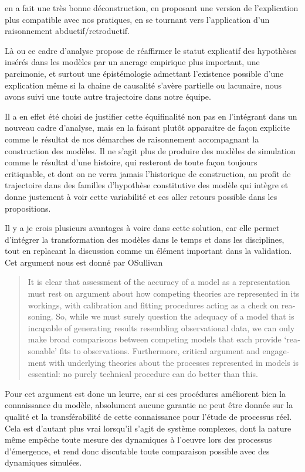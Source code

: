  \autocite{Besse2000} en a fait une très bonne déconstruction, en proposant une version de l'explication plus compatible avec nos pratiques, en se tournant  vers l'application d'un raisonnement abductif/retroductif.

Là ou ce cadre d'analyse propose de réaffirmer le statut explicatif des hypothèses insérés dans les modèles par un ancrage empirique plus important, une parcimonie, et surtout une épistémologie admettant l'existence possible d'une explication même si la chaine de causalité s'avère partielle ou lacunaire, nous avons suivi une toute autre trajectoire dans notre équipe.

Il a en effet été choisi de justifier cette équifinalité non pas en l'intégrant dans un nouveau cadre d'analyse, mais en la faisant plutôt apparaitre de façon explicite comme le résultat de nos démarches de raisonnement accompagnant la construction des modèles. Il ne s'agit plus de produire des modèles de simulation comme le résultat d'une histoire, qui resteront de toute façon toujours critiquable, et dont on ne verra jamais l'historique de construction, au profit de trajectoire dans des familles d'hypothèse constitutive des modèle qui intègre et donne justement à voir cette variabilité et ces aller retours possible dans les propositions.

Il y a je crois plusieurs avantages à voire dans cette solution, car elle permet d'intégrer la transformation des modèles dans le temps et dans les disciplines, tout en replacant la discussion comme un élément important dans la validation. Cet argument nous est donné par OSullivan 

\foreignblockquote{english}[\cite{OSullivan2004}]{It is clear that assessment of the accuracy of a model as a representation must rest on argument about how competing theories are represented in its workings, with calibration and fitting procedures acting as a check on reasoning. So, while we must surely question the adequacy of a model that is incapable of generating results resembling observational data, we can only make broad comparisons between competing models that each provide ‘reasonable’ fits to observations. Furthermore, critical argument and engagement with underlying theories about the processes represented in models is essential: no purely technical procedure can do better than this.}



Pour \autocite{OSullivan2004} cet argument est donc un leurre, car si ces procédures améliorent bien la connaissance du modèle, absolument aucune garantie ne peut être donnée sur la qualité et la transférabilité de cette connaissance pour l'étude de processus réel. Cela est d'autant plus vrai lorsqu'il s'agit de système complexes, dont la nature même empêche toute  mesure des dynamiques à l'oeuvre lors des processus d'émergence, et rend donc discutable toute comparaison possible avec des dynamiques simulées.

